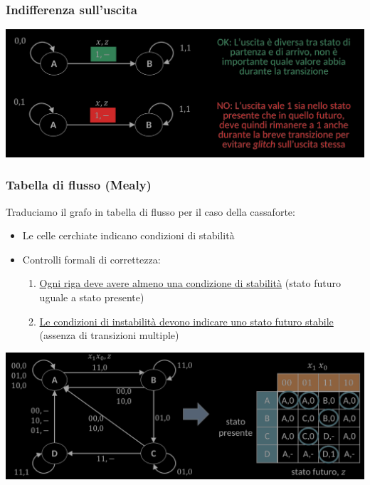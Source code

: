 \documentclass{article}
\begin{document}
\subsubsection{Indifferenza sull’uscita}
\begin{center}
    \includegraphics[scale=0.5]{indifferenza.png}
\end{center}
\subsubsection{Tabella di flusso (Mealy)}
Traduciamo il grafo in tabella di flusso per il caso della cassaforte:
\begin{itemize}
    \item Le celle cerchiate indicano condizioni di stabilità
    \item Controlli formali di correttezza:
    \begin{enumerate}
        \item \underline{Ogni riga deve avere almeno una condizione di stabilità} (stato futuro uguale a stato presente)
        \item \underline{Le condizioni di instabilità devono indicare uno stato futuro stabile} (assenza di transizioni multiple) 
    \end{enumerate}
\end{itemize}
\begin{center}
    \includegraphics[scale=0.55]{TDFMealy.png}
\end{center}
\end{document}
